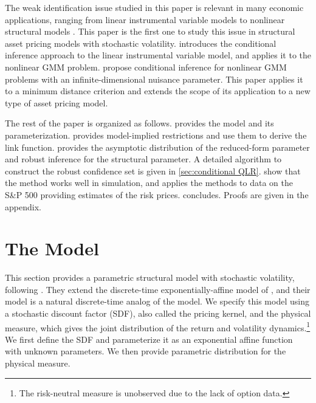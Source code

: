 \documentclass[11pt, letterpaper, twoside]{article}
\begin{document}
The weak identification issue studied in this paper is relevant in many economic applications, ranging from linear instrumental variable models \parencite{staiger1997instrumental} to nonlinear structural models \parencites{mavroeidis2014empirical, andrews2015maximum}. This paper is the first one to study this issue in structural asset pricing models with stochastic volatility. \Textcite{moreira2003conditional} introduces the conditional inference approach to the linear instrumental variable model, and \textcite{kleibergen2005testing} applies it to the nonlinear GMM problem. \Textcite{andrews2016conditional} propose conditional inference for nonlinear GMM problems with an infinite-dimensional nuisance parameter. This paper applies it to a minimum distance criterion and extends the scope of its application to a new type of asset pricing model.

The rest of the paper is organized as follows.  provides the model and its parameterization.  provides model-implied restrictions and use them to derive the link function.  provides the asymptotic distribution of the reduced-form parameter and robust inference for the structural parameter. A detailed algorithm to construct the robust confidence set is given in \cref{sec:conditional QLR}. 
 show that the method works well in simulation, and  applies the methods to data on the S\&P 500 providing estimates of the risk prices.  concludes. 
Proofs are given in the appendix.

\section{The Model}\label{sec:model}

This section provides a parametric structural model with stochastic volatility, following \textcite{han2018leverage}. They extend the discrete-time exponentially-affine model of \textcite{darolles2006structural}, and their model is a natural discrete-time analog of the \textcite{heston1993closedform} model. We specify this model using a stochastic discount factor (SDF), also called the pricing kernel, and the physical measure, which gives the joint distribution of the return and volatility dynamics.\footnote{The risk-neutral measure is unobserved due to the lack of option data.} We first define the SDF and parameterize it as an exponential affine function with unknown parameters. We then provide parametric distribution for the physical measure. 
  
\end{document}
